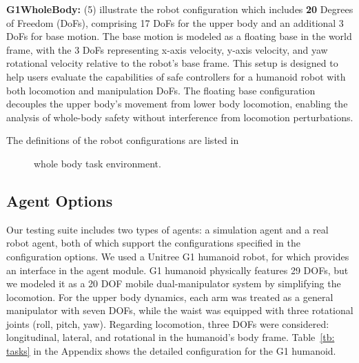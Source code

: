 \textbf{G1WholeBody:}  (5) illustrate the robot configuration which includes \textbf{20} Degrees of Freedom (DoFs), comprising 17 DoFs for the upper body and an additional 3 DoFs for base motion. The base motion is modeled as a floating base in the world frame, with the 3 DoFs representing x-axis velocity, y-axis velocity, and yaw rotational velocity relative to the robot's base frame. This setup is designed to help users evaluate the capabilities of safe controllers for a humanoid robot with both locomotion and manipulation DoFs. The floating base configuration decouples the upper body’s movement from lower body locomotion, enabling the analysis of whole-body safety without interference from locomotion perturbations.

The definitions of the robot configurations are listed in 


\begin{figure}[htbp]
    \centering
    \vspace{2cm}  %
    \vspace{2.2cm}
    \caption{\spark whole body task environment.}
    \label{fig: whole_body}
\end{figure}

\subsection{Agent Options}
Our testing suite includes two types of agents: a simulation agent and a real robot agent, both of which support the configurations specified in the configuration options. We used a Unitree G1 humanoid robot, for which \spark provides an interface in the agent module. G1 humanoid physically features 29 DOFs, but we modeled it as a 20 DOF mobile dual-manipulator system by simplifying the locomotion.
For the upper body dynamics, each arm was treated as a general manipulator with seven DOFs, while the waist was equipped with three rotational joints (roll, pitch, yaw).
Regarding locomotion, three DOFs were considered: longitudinal, lateral, and rotational in the humanoid's body frame. 
Table~\ref{tb: tasks} in the Appendix shows the detailed configuration for the G1 humanoid.

